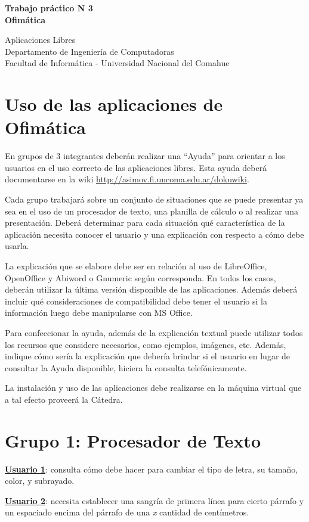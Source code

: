 \documentclass[12pt]{article}
\def\maketitle{

 \makeatletter
 {\color{bl} \centering \huge \sc \textbf{
Trabajo práctico N 3 \\
\large \vspace*{-8pt} \color{black} Ofimática
 \vspace*{8pt} }\par}
 \makeatother


 \makeatletter
 {\centering \small 
	Aplicaciones Libres\\
 	Departamento de Ingeniería de Computadoras \\
 	Facultad de Informática - Universidad Nacional del Comahue \\
 	\vspace{20pt} }
 \makeatother

}
\begin{document}
\thispagestyle{empty}
\maketitle
\setlength{\parindent}{0pt}

\section*{Uso de las aplicaciones de Ofimática}  

En grupos de 3 integrantes deberán realizar una ``Ayuda'' para orientar a los usuarios en el uso correcto de las aplicaciones libres. Esta ayuda deberá documentarse en la wiki \url{http://asimov.fi.uncoma.edu.ar/dokuwiki}.

Cada grupo trabajará sobre un conjunto de situaciones que se puede presentar ya sea en el uso de un procesador de texto, una planilla de cálculo o al realizar una presentación. Deberá determinar para cada situación qué característica de la aplicación necesita conocer el usuario y una explicación con respecto a cómo debe usarla.  

La explicación que se elabore debe ser en relación al uso de LibreOffice, OpenOffice y Abiword o Gnumeric según corresponda. En todos los casos, deberán utilizar la última versión disponible de las aplicaciones. Además deberá incluir qué consideraciones de compatibilidad debe tener el usuario si la información luego debe manipularse con MS Office.

Para confeccionar la ayuda, además de la explicación textual puede utilizar todos los recursos que considere necesarios, como ejemplos, imágenes, etc. Además, indique cómo sería la explicación que debería brindar si el usuario en lugar de consultar la Ayuda disponible, hiciera la consulta telefónicamente.

La instalación y uso de las aplicaciones debe realizarse en la máquina virtual que a tal efecto proveerá la Cátedra.

\section*{\textbf{Grupo 1: Procesador de Texto}}

\textbf{\underline{Usuario 1}}: consulta cómo debe hacer para cambiar el tipo de letra, su tamaño, color, y subrayado.

\textbf{\underline{Usuario 2}}: necesita establecer una sangría de primera línea para cierto párrafo y un espaciado encima del párrafo de una \textit{x} cantidad de centímetros.
\end{document}
